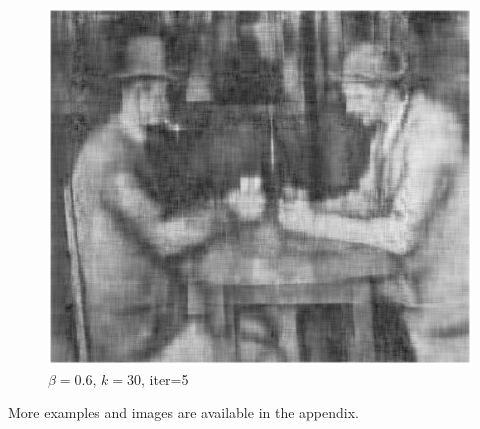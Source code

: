 \documentclass[11pt,onecolumn]{article}
\begin{document}
\begin{figure}[H]
  \begin{minipage}{0.3\textwidth}
    \centering
    \includegraphics[width=1\textwidth]{./images/206.png}
    \caption{$\beta=0.6$, $k=30$, iter=5}
  \end{minipage}
\end{figure}

More examples and images are available in the appendix.


\end{document}
